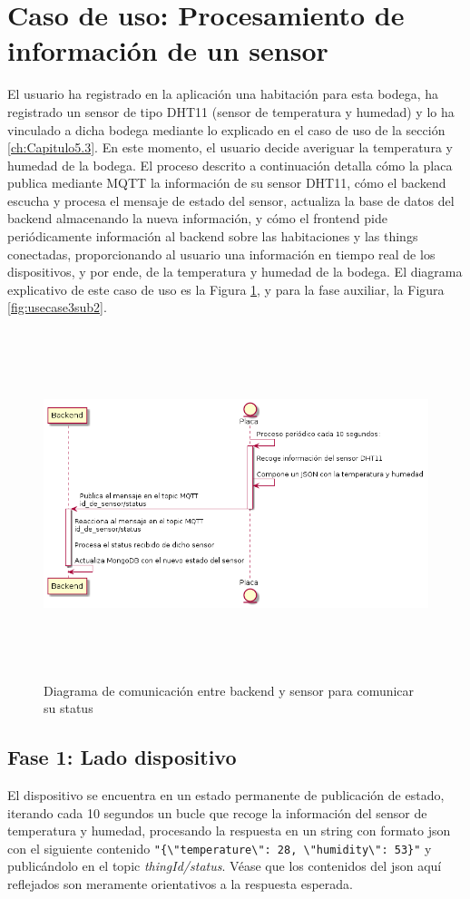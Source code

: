 \section{Caso de uso: Procesamiento de información de un sensor}
\label{ch:Capitulo5.4}
El usuario ha registrado en la aplicación una habitación para esta bodega, ha registrado un sensor de tipo DHT11 (sensor de temperatura y humedad) y lo ha vinculado a dicha bodega mediante lo explicado en el caso de uso de la sección \ref{ch:Capitulo5.3}. En este momento, el usuario decide averiguar la temperatura y humedad de la bodega. El proceso descrito a continuación detalla cómo la placa publica mediante MQTT la información de su sensor DHT11, cómo el backend escucha y procesa el mensaje de estado del sensor, actualiza la base de datos del backend almacenando la nueva información, y cómo el frontend pide periódicamente información al backend sobre las habitaciones y las things conectadas, proporcionando al usuario una información en tiempo real de los dispositivos, y por ende, de la temperatura y humedad de la bodega.
El diagrama explicativo de este caso de uso es la Figura \ref{fig:usecase3sub1}, y para la fase auxiliar, la Figura \ref{fig:usecase3sub2}.

\begin{figure}[hbt!]
\centering
\includegraphics[height=4in]{figures/diagrams/use-cases/sensorInfo.png}
\caption[usecase3sub1]{Diagrama de comunicación entre backend y sensor para comunicar su status\footnotemark}
\label{fig:usecase3sub1}
\end{figure}

\subsection{Fase 1: Lado dispositivo}
\label{ch:Capitulo5.4.1}
El dispositivo se encuentra en un estado permanente de publicación de estado, iterando cada 10 segundos un bucle que recoge la información del sensor de temperatura y humedad, procesando la respuesta en un string con formato \gls{json} con el siguiente contenido \verb|"{\"temperature\": 28, \"humidity\": 53}"| y publicándolo en el topic \textit{thingId/status}. Véase que los contenidos del \gls{json} aquí reflejados son meramente orientativos a la respuesta esperada.

